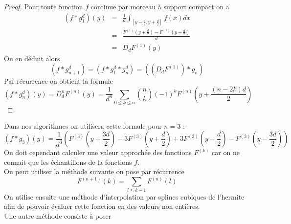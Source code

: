 \begin{proof}
Pour toute fonction $f$ continue par morceau à support compact on a 
\begin{eqnarray*}
(f * g_1^d )(y)&=&\frac{1}{d} \int_{[y-\frac{d}{2},y+\frac{d}{2}]} f(x) dx\\
               &=&\frac{F^{(1)}(y+\frac{d}{2})-F^{(1)}(y-\frac{d}{2})}{d}\\
               &=&D_d F^{(1)}(y)
\end{eqnarray*}
On en déduit alors 
\begin{equation*}
(f*g_{n+1}^{d})=(f*g_1^d * g_{n}^{d})= ((D_d F^{(1)})*g_n )
\end{equation*}
Par récurrence on obtient la formule 
\begin{equation*}
(f*g_n^d)(y)=D_d ^n F^{(n)}(y)= \frac{1}{d^n}\underset{0 \le k\le n}{\sum} \binom{n}{k}(-1)^{k} F^{(n)}(y+\frac{(n-2k)d}{2})
\end{equation*}

\end{proof}
Dans nos algorithmes  on utilisera cette formule pour $n=3$ :
\begin{equation*}
(f*g_3)(y)=\frac{1}{d^3}(F^{(3)}(y+\frac{3d}{2})-3F^{(3)}(y+\frac{d}{2})+3F^{(3)}(y-\frac{d}{2})-F^{(3)}(y-\frac{3d}{2}))
\end{equation*}
On doit cependant calculer une valeur approchée des fonctions $F^{(k)}$  car on ne connait que les échantillons de la fonctions $f$.\\
On peut utiliser la méthode suivante on pose par récurrence
\begin{equation*}
F^{(n+1)}(k)=\underset{l\le k-1}{\sum}F^{(n)}(l)
\end{equation*}
On utilise ensuite une méthode d'interpolation par splines cubiques de l'hermite afin de pouvoir évaluer cette fonction en des valeurs non entières.\\
Une autre méthode consiste à poser 

